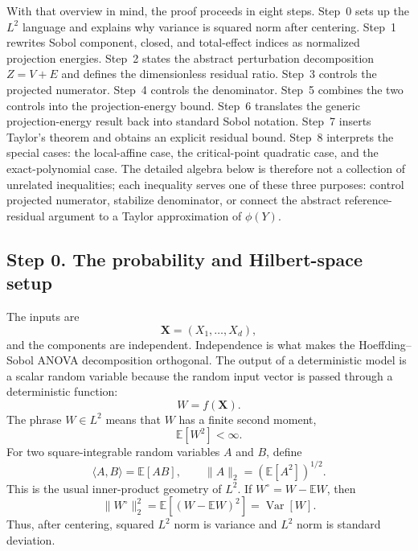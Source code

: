 \documentclass[11pt,letterpaper]{article}
\DeclareMathOperator{\Var}{Var}
\newcommand{\E}{\mathbb{E}}
\newcommand{\bX}{\boldsymbol{X}}
\theoremstyle{remark}
\begin{document}
With that overview in mind, the proof proceeds in eight steps. Step~0 sets up
the $L^2$ language and explains why variance is squared norm after centering.
Step~1 rewrites Sobol component, closed, and total-effect indices as normalized
projection energies. Step~2 states the abstract perturbation decomposition
$Z=V+E$ and defines the dimensionless residual ratio. Step~3 controls the
projected numerator. Step~4 controls the denominator. Step~5 combines the two
controls into the projection-energy bound. Step~6 translates the generic
projection-energy result back into standard Sobol notation. Step~7 inserts
Taylor's theorem and obtains an explicit residual bound. Step~8 interprets the
special cases: the local-affine case, the critical-point quadratic case, and the
exact-polynomial case. The detailed algebra below is therefore not a collection
of unrelated inequalities; each inequality serves one of these three purposes:
control projected numerator, stabilize denominator, or connect the abstract
reference-residual argument to a Taylor approximation of $\phi(Y)$.

\subsection*{Step 0. The probability and Hilbert-space setup}

The inputs are
\begin{equation}
  \bX=(X_1,\ldots,X_d),
\end{equation}
and the components are independent. Independence is what makes the
Hoeffding--Sobol ANOVA decomposition orthogonal. The output of a deterministic
model is a scalar random variable because the random input vector is passed
through a deterministic function:
\begin{equation}
  W=f(\bX).
\end{equation}
The phrase $W\in L^2$ means that $W$ has a finite second moment,
\begin{equation}
  \E[W^2]<\infty.
\end{equation}
For two square-integrable random variables $A$ and $B$, define
\begin{equation}
  \langle A,B\rangle=\E[AB],
  \qquad
  \|A\|_2=(\E[A^2])^{1/2}.
\end{equation}
This is the usual inner-product geometry of $L^2$. If $W^\circ=W-\E W$, then
\begin{equation}
  \|W^\circ\|_2^2
  =\E[(W-\E W)^2]
  =\Var[W].
\end{equation}
Thus, after centering, squared $L^2$ norm is variance and $L^2$ norm is standard
deviation.
\end{document}
